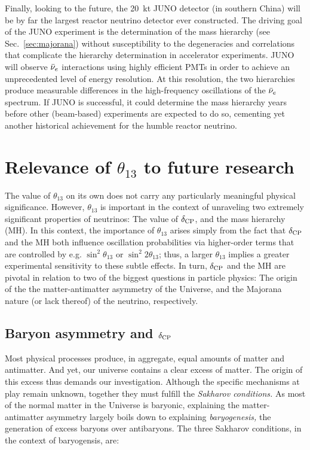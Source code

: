 \documentclass[../thesis.tex]{subfiles}
\begin{document}
Finally, looking to the future, the 20~kt JUNO detector (in southern China) will
be by far the largest reactor neutrino detector ever constructed. The driving
goal of the JUNO experiment is the determination of the mass hierarchy (see
Sec.~\ref{sec:majorana}) without susceptibility to the degeneracies and
correlations that complicate the hierarchy determination in accelerator
experiments. JUNO will observe $\bar\nu_e$ interactions using highly efficient
PMTs in order to achieve an unprecedented level of energy resolution. At this
resolution, the two hierarchies produce measurable differences in the
high-frequency oscillations of the $\bar\nu_e$ spectrum. If JUNO is successful,
it could determine the mass hierarchy years before other (beam-based)
experiments are expected to do so, cementing yet another historical achievement
for the humble reactor neutrino.

\section{Relevance of $\theta_{13}$ to future research}
\label{sec:futureRelevance}

The value of $\theta_{13}$ on its own does not carry any particularly meaningful
physical significance. However, $\theta_{13}$ is important in the context of
unraveling two extremely significant properties of neutrinos: The value of
$\delta_\text{CP}$, and the mass hierarchy (MH). In this context, the importance of
$\theta_{13}$ arises simply from the fact that $\delta_\text{CP}$ and the MH both influence
oscillation probabilities via higher-order terms that are controlled by
e.g. \(\sin^2\theta_{13}\) or \(\sin^2 2\theta_{13}\); thus, a larger
$\theta_{13}$ implies a greater experimental sensitivity to these subtle
effects. In turn, $\delta_\text{CP}$ and the MH are pivotal in relation to two of the
biggest questions in particle physics: The origin of the the matter-antimatter
asymmetry of the Universe, and the Majorana nature (or lack thereof) of the
neutrino, respectively.

\subsection{Baryon asymmetry and $\delta_\text{CP}$}
\label{sec:baryonAsym}

Most physical processes produce, in aggregate, equal amounts of matter and
antimatter. And yet, our universe contains a clear excess of matter. The origin
of this excess thus demands our investigation. Although the specific mechanisms
at play remain unknown, together they must fulfill the \emph{Sakharov
  conditions.} As most of the normal matter in the Universe is baryonic,
explaining the matter-antimatter asymmetry largely boils down to explaining
\emph{baryogenesis,} the generation of excess baryons over antibaryons. The
three Sakharov conditions, in the context of baryogensis, are:
\end{document}
